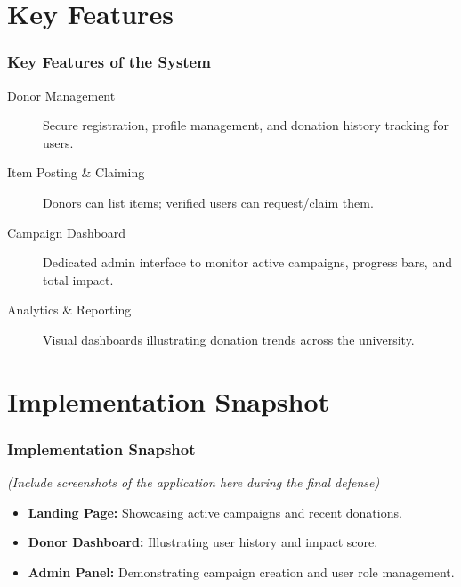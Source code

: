 \documentclass[10pt, compress, aspectratio=169]{beamer}
\begin{document}
\section{Key Features}
\begin{frame}
    \frametitle{Key Features of the System}
    \begin{description}
        \item[Donor Management] Secure registration, profile management, and donation history tracking for users.
        \item[Item Posting \& Claiming] Donors can list items; verified users can request/claim them.
        \item[Campaign Dashboard] Dedicated admin interface to monitor active campaigns, progress bars, and total impact.
        \item[Analytics \& Reporting] Visual dashboards illustrating donation trends across the university.
    \end{description}
\end{frame}

\section{Implementation Snapshot}
\begin{frame}
    \frametitle{Implementation Snapshot}
    \begin{center}
        \textit{(Include screenshots of the application here during the final defense)}
        \vspace{0.5cm}
        \begin{itemize}
            \item \textbf{Landing Page:} Showcasing active campaigns and recent donations.
            \item \textbf{Donor Dashboard:} Illustrating user history and impact score.
            \item \textbf{Admin Panel:} Demonstrating campaign creation and user role management.
        \end{itemize}
    \end{center}
\end{frame}

\end{document}
